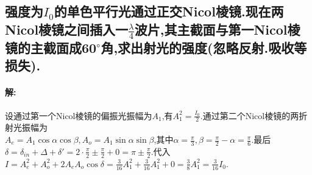 \documentclass[UTF8]{article}
\begin{document}
    \subsection{强度为$I_0$的单色平行光通过正交Nicol棱镜.现在两Nicol棱镜之间插入一$\frac{\lambda}{4}$波片,其主截面与第一Nicol棱镜的主截面成60$^\circ$角,求出射光的强度(忽略反射.吸收等损失).} %
    \paragraph{解: }设通过第一个Nicol棱镜的偏振光振幅为$A_1$,有$A_1^2=\frac{I_0}{2}$.通过第二个Nicol棱镜的两折射光振幅为\\$A_e=A_1\cos\alpha\cos\beta,A_o=A_1\sin\alpha\sin\beta$,其中$\alpha=\frac{\pi}{3},\beta=\frac{\pi}{2}-\alpha=\frac{\pi}{6}$.最后$\delta=\delta_{in}+\Delta+\delta'=2\cdot\frac{\pi}{2}\pm\frac{\pi}{2}+0=\pi\pm\frac{\pi}{2}$.代入$I=A_e^2+A_o^2+2A_eA_o\cos \delta=\frac{3}{16}A_1^2+\frac{3}{16}A_1^2+0=\frac{3}{8}A_1^2=\frac{3}{16}I_0$.
\end{document}
